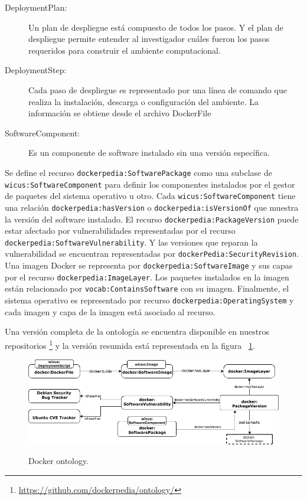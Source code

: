\begin{description}
	\item [DeploymentPlan:]  Un plan de despliegue está compuesto de todos los pasos. Y el plan de despliegue permite entender al investigador cuáles fueron los pasos requeridos para construir el ambiente computacional.
	\item [DeploymentStep:] Cada paso de despliegue es representado por una línea de comando que realiza la instalación, descarga o configuración del ambiente. La información se obtiene desde el archivo DockerFile
	\item [SoftwareComponent:] Es un componente de software instalado sin una versión específica. 
\end{description} 

Se define el recurso \verb|dockerpedia:SoftwarePackage| como una subclase de \verb|wicus:SoftwareComponent| para definir los componentes instalados por el gestor de paquetes del sistema operativo u otro.
Cada \verb|wicus:SoftwareComponent| tiene una relación \verb|dockerpedia:hasVersion| o \verb|dockerpedia:isVersionOf| que muestra la versión del software instalado.
El recurso \verb|dockerpedia:PackageVersion| puede estar afectado por vulnerabilidades representadas por el recurso \verb|dockerpedia:SoftwareVulnerability|. Y las versiones que reparan la vulnerabilidad se encuentran representadas por \verb|dockerPedia:SecurityRevision|.
Una imagen Docker se representa por \verb|dockerpedia:SoftwareImage| y sus capas por el recurso \verb|dockerpedia:ImageLayer|. Los paquetes instalados en la imagen están relacionado por \verb|vocab:ContainsSoftware| con su imagen.
Finalmente, el sistema operativo es representado por recurso \verb|dockerpedia:OperatingSystem| y cada imagen y capa de la imagen está asociado al recurso.

Una versión completa de la ontología se encuentra disponible en nuestros repositorios \footnote{\url{https://github.com/dockerpedia/ontology/}} y la versión resumida está representada en la figura ~\ref{fig:ontology}. 

\begin{figure}
  \caption{Docker ontology.}
  \centering
    \includegraphics[width=1\textwidth]{Figures/dockerOntologyBasic.png}
    \label{fig:ontology}
\end{figure}

